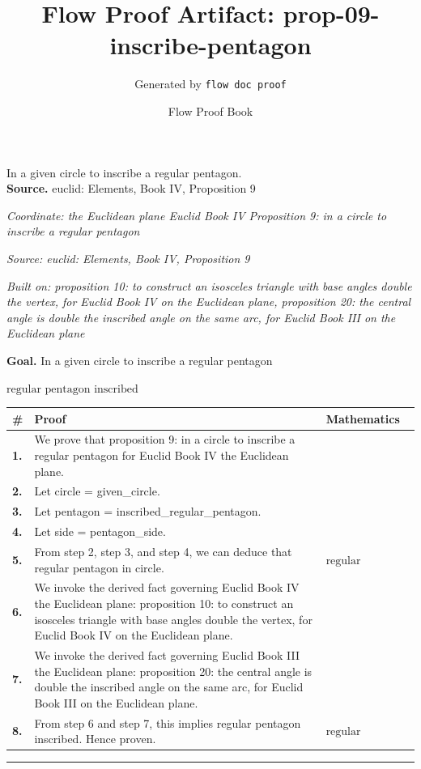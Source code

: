 \documentclass[11pt]{article}
\title{Flow Proof Artifact: prop-09-inscribe-pentagon}
\author{Generated by \texttt{flow doc proof}}
\date{Flow Proof Book}
\theoremstyle{definition}
\begin{document}
\maketitle
In a given circle to inscribe a regular pentagon.\\[0.5em]
\textbf{Source.} euclid: Elements, Book IV, Proposition 9\\[0.5em]
\bigskip
{}\par
\smallskip\noindent\textit{Coordinate: the Euclidean plane \cdot Euclid Book IV \cdot Proposition 9: in a circle to inscribe a regular pentagon}\par
\smallskip\noindent\textit{Source: euclid: Elements, Book IV, Proposition 9}\par
\smallskip\noindent\textit{Built on: proposition 10: to construct an isosceles triangle with base angles double the vertex, for Euclid Book IV on the Euclidean plane, proposition 20: the central angle is double the inscribed angle on the same arc, for Euclid Book III on the Euclidean plane}\par
\medskip
\noindent\textbf{Goal.} In a given circle to inscribe a regular pentagon\par
\noindent$\displaystyle \text{regular pentagon inscribed}$\par
\medskip
\noindent
\begin{tabular}{@{} >{\raggedright\arraybackslash}p{} >{\raggedright\arraybackslash}p{} >{\raggedleft\arraybackslash}p{} @{}}
\textbf{\#} & \textbf{Proof} & \textbf{Mathematics} \\
\midrule
\textbf{1.} & We prove that proposition 9: in a circle to inscribe a regular pentagon for Euclid Book IV the Euclidean plane. & \\[0.45em]
\textbf{2.} & Let circle = given\_circle. & \\[0.45em]
\textbf{3.} & Let pentagon = inscribed\_regular\_pentagon. & \\[0.45em]
\textbf{4.} & Let side = pentagon\_side. & \\[0.45em]
\textbf{5.} & From step 2, step 3, and step 4, we can deduce that regular pentagon in circle. & $\displaystyle \text{regular pentagon in circle}$ \\[0.45em]
\textbf{6.} & We invoke the derived fact governing Euclid Book IV the Euclidean plane: proposition 10: to construct an isosceles triangle with base angles double the vertex, for Euclid Book IV on the Euclidean plane. & \\[0.45em]
\textbf{7.} & We invoke the derived fact governing Euclid Book III the Euclidean plane: proposition 20: the central angle is double the inscribed angle on the same arc, for Euclid Book III on the Euclidean plane. & \\[0.45em]
\textbf{8.} & From step 6 and step 7, this implies regular pentagon inscribed. Hence proven. & $\displaystyle \text{regular pentagon inscribed}$ \\[0.45em]
\bottomrule
\end{tabular}
\label{thm:Geometry-Euclid Book IV-proposition_9_in_a_circle_to_inscribe_a_regular_pentagon}
\par\medskip\hrule
\end{document}
